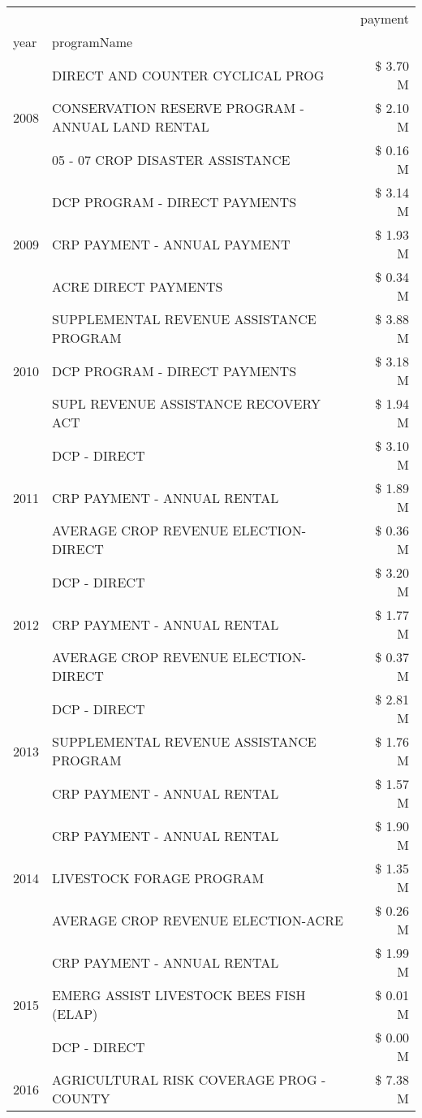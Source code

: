 \begin{tabular}{llr}
\toprule
 &  & payment \\
year & programName &  \\
\midrule
\multirow[t]{3}{*}{2008} & DIRECT AND COUNTER CYCLICAL PROG & \$ 3.70 M \\
 & CONSERVATION RESERVE PROGRAM - ANNUAL LAND RENTAL & \$ 2.10 M \\
 & 05 - 07 CROP DISASTER ASSISTANCE & \$ 0.16 M \\
\cline{1-3}
\multirow[t]{3}{*}{2009} & DCP PROGRAM - DIRECT PAYMENTS & \$ 3.14 M \\
 & CRP PAYMENT - ANNUAL PAYMENT & \$ 1.93 M \\
 & ACRE DIRECT PAYMENTS & \$ 0.34 M \\
\cline{1-3}
\multirow[t]{3}{*}{2010} & SUPPLEMENTAL REVENUE ASSISTANCE PROGRAM & \$ 3.88 M \\
 & DCP PROGRAM - DIRECT PAYMENTS & \$ 3.18 M \\
 & SUPL REVENUE ASSISTANCE RECOVERY ACT & \$ 1.94 M \\
\cline{1-3}
\multirow[t]{3}{*}{2011} & DCP - DIRECT & \$ 3.10 M \\
 & CRP PAYMENT - ANNUAL RENTAL & \$ 1.89 M \\
 & AVERAGE CROP REVENUE ELECTION-DIRECT & \$ 0.36 M \\
\cline{1-3}
\multirow[t]{3}{*}{2012} & DCP - DIRECT & \$ 3.20 M \\
 & CRP PAYMENT - ANNUAL RENTAL & \$ 1.77 M \\
 & AVERAGE CROP REVENUE ELECTION-DIRECT & \$ 0.37 M \\
\cline{1-3}
\multirow[t]{3}{*}{2013} & DCP - DIRECT & \$ 2.81 M \\
 & SUPPLEMENTAL REVENUE ASSISTANCE PROGRAM & \$ 1.76 M \\
 & CRP PAYMENT - ANNUAL RENTAL & \$ 1.57 M \\
\cline{1-3}
\multirow[t]{3}{*}{2014} & CRP PAYMENT - ANNUAL RENTAL & \$ 1.90 M \\
 & LIVESTOCK FORAGE PROGRAM & \$ 1.35 M \\
 & AVERAGE CROP REVENUE ELECTION-ACRE & \$ 0.26 M \\
\cline{1-3}
\multirow[t]{3}{*}{2015} & CRP PAYMENT - ANNUAL RENTAL & \$ 1.99 M \\
 & EMERG ASSIST LIVESTOCK BEES FISH (ELAP) & \$ 0.01 M \\
 & DCP - DIRECT & \$ 0.00 M \\
\cline{1-3}
\multirow[t]{3}{*}{2016} & AGRICULTURAL RISK COVERAGE PROG - COUNTY & \$ 7.38 M \\

\end{tabular}
